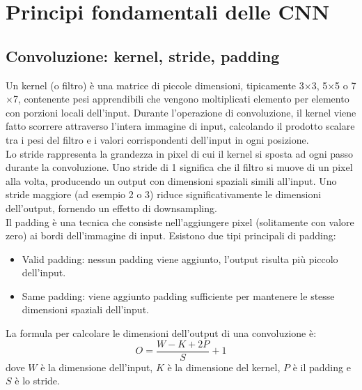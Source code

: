 \documentclass[a4paper,12pt]{report}
\begin{document}
	\section{Principi fondamentali delle CNN}
	
	\subsection{Convoluzione: kernel, stride, padding}
	Un kernel (o filtro) è una matrice di piccole dimensioni, tipicamente 3$\times$3, 5$\times$5 o 7$\times$7, contenente pesi apprendibili che vengono moltiplicati elemento per elemento con porzioni locali dell'input. Durante l'operazione di convoluzione, il kernel viene fatto scorrere attraverso l'intera immagine di input, calcolando il prodotto scalare tra i pesi del filtro e i valori corrispondenti dell'input in ogni posizione. \\
	Lo stride rappresenta la grandezza in pixel di cui il kernel si sposta ad ogni passo durante la convoluzione. Uno stride di 1 significa che il filtro si muove di un pixel alla volta, producendo un output con dimensioni spaziali simili all'input. Uno stride maggiore (ad esempio 2 o 3) riduce significativamente le dimensioni dell'output, fornendo un effetto di downsampling. \\
	Il padding è una tecnica che consiste nell'aggiungere pixel (solitamente con valore zero) ai bordi dell'immagine di input. Esistono due tipi principali di padding:
	\begin{itemize}
		\item Valid padding: nessun padding viene aggiunto, l'output risulta più piccolo dell'input.
		\item Same padding: viene aggiunto padding sufficiente per mantenere le stesse dimensioni spaziali dell'input.
	\end{itemize}
	La formula per calcolare le dimensioni dell'output di una convoluzione è:
	$$O = \frac{W - K + 2P}{S} + 1$$
	dove $W$ è la dimensione dell'input, $K$ è la dimensione del kernel, $P$ è il padding e $S$ è lo stride.
	
\end{document}

